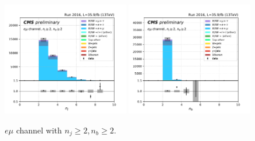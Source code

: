 \begin{figure}[ht]
    \includegraphics[width=0.49\textwidth]{chapters/Analysis/sectionPlots/figures/kinematics_pickles/emu2/2b/emu2_2b_nJets.pdf}
    \includegraphics[width=0.49\textwidth]{chapters/Analysis/sectionPlots/figures/kinematics_pickles/emu2/2b/emu2_2b_nBJets.pdf}
    
    \caption{$e\mu$ channel with $n_j\geq2, n_b\geq2$.}
\end{figure}


